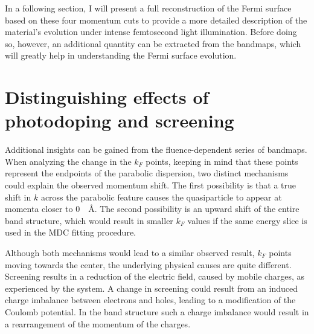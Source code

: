 In a following section, I will present a full reconstruction of the Fermi surface based on these four momentum cuts to provide a more detailed description of the material’s evolution under intense femtosecond light illumination.
Before doing so, however, an additional quantity can be extracted from the bandmaps, which will greatly help in understanding the Fermi surface evolution.

\section{Distinguishing effects of photodoping and screening}
\label{sec:mu}

Additional insights can be gained from the fluence-dependent series of bandmaps.
When analyzing the change in the $k_F$ points, keeping in mind that these points represent the endpoints of the parabolic dispersion, two distinct mechanisms could explain the observed momentum shift.
The first possibility is that a true shift in $k$ across the parabolic feature causes the quasiparticle to appear at momenta closer to \qty{0}{\per\angstrom}.
The second possibility is an upward shift of the entire band structure, which would result in smaller $k_F$ values if the same energy slice is used in the MDC fitting procedure.

Although both mechanisms would lead to a similar observed result, $k_F$ points moving towards the center, the underlying physical causes are quite different.
Screening results in a reduction of the electric field, caused by mobile charges, as experienced by the system.
A change in screening could result from an induced charge imbalance between electrons and holes, leading to a modification of the Coulomb potential.
In the band structure such a charge imbalance would result in a rearrangement of the momentum of the charges.

